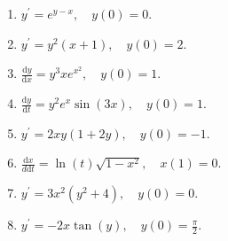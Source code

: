 \begin{enumerate}
    \item[1.]\(\displaystyle y^{\prime} = e^{y - x}, \quad y(0) = 0\).
    \item[2.]\(\displaystyle y^{\prime} = y^{2}(x + 1), \quad y(0) = 2\).
    \item[3.]\(\displaystyle\frac{\mathrm{d}y}{\mathrm{d}x} = y^{3}x e^{x^{2}}, \quad y(0) = 1\).
    \item[4.]\(\displaystyle\frac{\mathrm{d}y}{\mathrm{d}t} = y^{2}e^{x}\sin (3x), \quad y(0) = 1\).
    \item[5.]\(\displaystyle y^{\prime} = 2xy(1 + 2y), \quad y(0) = -1\).
    \item[6.]\(\displaystyle \frac{\mathrm{d}x}{d\mathrm{d}t} = \ln (t)\sqrt{1 - x^{2}}, \quad x(1) = 0\).
    \item[7.]\(\displaystyle y^{\prime} = 3x^{2}\left(y^{2} + 4\right), \quad y(0) = 0\).
    \item[8.]\(\displaystyle y^{\prime} = -2x\tan (y), \quad y(0) = \frac{\pi}{2}\).
\end{enumerate}

